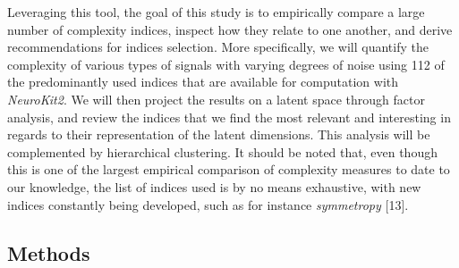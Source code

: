 \documentclass[
  man]{apa6}
\begin{document}
Leveraging this tool, the goal of this study is to empirically compare a large number of complexity indices, inspect how they relate to one another, and derive recommendations for indices selection. More specifically, we will quantify the complexity of various types of signals with varying degrees of noise using 112 of the predominantly used indices that are available for computation with \emph{NeuroKit2}. We will then project the results on a latent space through factor analysis, and review the indices that we find the most relevant and interesting in regards to their representation of the latent dimensions. This analysis will be complemented by hierarchical clustering. It should be noted that, even though this is one of the largest empirical comparison of complexity measures to date to our knowledge, the list of indices used is by no means exhaustive, with new indices constantly being developed, such as for instance \emph{symmetropy} {[}13{]}.

\hypertarget{methods}{%
\subsection{Methods}\label{methods}}
\end{document}
